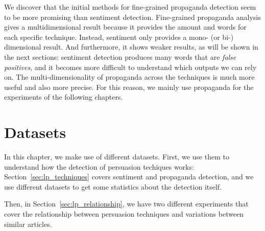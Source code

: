 We discover that
the initial methods for fine-grained propaganda detection seem to be more promising %
than sentiment detection.
Fine-grained propaganda analysis gives a multidimensional result because it provides the amount and words for each specific technique. Instead, sentiment only provides a mono- (or bi-) dimensional result. And furthermore, it shows weaker results, as will be shown in the next sections: sentiment detection produces many words that are \emph{false positives}, and it becomes more difficult to understand which outputs we can rely on.
The multi-dimensionality of propaganda across the techniques is much more useful and also more precise.
For this reason, we mainly use propaganda for the experiments of the following chapters. 


\section{Datasets}
\label{sec:lp_datasets}

In this chapter, we make use of different datasets. 
First, we use them to understand how the detection of persuasion techiques works: Section~\ref{sec:lp_techniques} covers sentiment and propaganda detection, and we use different datasets to get some statistics about the detection itself.

Then, in Section~\ref{sec:lp_relationship}, we have two different experiments that cover the relationship between persuasion techniques and variations between similar articles.

